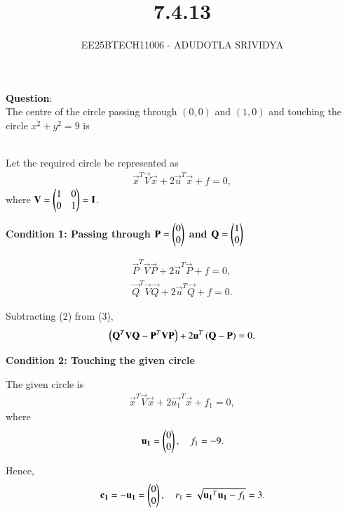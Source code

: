 \documentclass[journal]{IEEEtran}
\begin{document}

\vspace{3cm}

\title{7.4.13}
\author{EE25BTECH11006 - ADUDOTLA SRIVIDYA}
{\let\newpage\relax\maketitle}

\renewcommand{\thefigure}{\theenumi}
\renewcommand{\thetable}{\theenumi}
\setlength{\intextsep}{10pt} %

\textbf{Question}:\\
 The centre of the circle passing through $(0,0)$ and $(1,0)$ and touching the circle $x^2 +y^2 = 9$ is
 
\solution \\
Let the required circle be represented as
\begin{align}
\vec{x}^{T}\vec{V}\vec{x} + 2\vec{u}^{T}\vec{x} + f = 0,
\label{eq:circle-general}
\end{align}
where $\mathbf{V} = \begin{pmatrix}1 & 0 \\ 0 & 1\end{pmatrix} = \mathbf{I}$.

\textbf{Condition 1: Passing through $\mathbf{P}=\begin{pmatrix}0\\0\end{pmatrix}$ and $\mathbf{Q}=\begin{pmatrix}1\\0\end{pmatrix}$}

\begin{align}
\vec{P}^{T}\vec{V}\vec{P} + 2\vec{u}^{T}\vec{P} + f = 0, \label{eq:circle-P}\\
\vec{Q}^{T}\vec{V}\vec{Q} + 2\vec{u}^{T}\vec{Q} + f = 0. \label{eq:circle-Q}
\end{align}

Subtracting (2) from (3),
\begin{align}
\left(\mathbf{Q}^{T}\mathbf{V}\mathbf{Q} - \mathbf{P}^{T}\mathbf{V}\mathbf{P}\right) + 2\mathbf{u}^{T}\left(\mathbf{Q} - \mathbf{P}\right) = 0. \label{eq:diff}
\end{align}


\textbf{Condition 2: Touching the given circle}

The given circle is
\begin{align}
\vec{x}^{T}\vec{V}\vec{x} + 2\vec{u_1}^{T}\vec{x} + f_1 = 0,
\end{align}
where
\begin{align}
\mathbf{u_1} = \begin{pmatrix}0\\0\end{pmatrix}, \quad f_1 = -9.
\end{align}

Hence,
\begin{align}
\mathbf{c_1} = -\mathbf{u_1} = \begin{pmatrix}0\\0\end{pmatrix}, \quad r_1 = \sqrt{\mathbf{u_1}^{T}\mathbf{u_1} - f_1} = 3.
\end{align}
\end{document}
